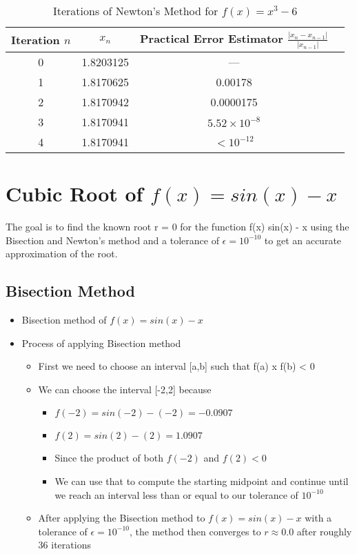 \documentclass[9pt]{extarticle}
\begin{document}
\begin{table}[H]
\centering
\begin{tabular}{|c|c|c|c|}
\hline
Iteration \(n\) & \(x_n\)           & Practical Error Estimator \( \frac{|x_n - x_{n-1}|}{|x_{n-1}|} \) \\ \hline
0               & 1.8203125         & —                                                      \\ \hline
1               & 1.8170625         & 0.00178                                                \\ \hline
2               & 1.8170942         & 0.0000175                                              \\ \hline
3               & 1.8170941         & \( 5.52 \times 10^{-8} \)                              \\ \hline
4               & 1.8170941         & \( < 10^{-12} \)                                       \\ \hline
\end{tabular}
\caption{Iterations of Newton's Method for \( f(x) = x^3 - 6 \)}
\label{tab:newtons_method_iterations}
\end{table}

\newpage
\section{Cubic Root of $f(x) = sin(x) - x$}
The goal is to find the known root r = 0 for the function f(x) sin(x) - x using the Bisection and Newton's method and a tolerance of $\epsilon = 10^{-10}$ to get an accurate approximation of the root.

\subsection{Bisection Method}
\begin{itemize}
    \item Bisection method of $f(x) = sin(x) - x$
    \item Process of applying Bisection method
    \begin{itemize}
        \item First we need to choose an interval [a,b] such that f(a) x f(b) < 0
        \item We can choose the interval [-2,2] because 
        \begin{itemize}
            \item $f(-2) = sin(-2)-(-2) = -0.0907$
            \item $f(2) = sin(2) -(2) = 1.0907$
            \item Since the product of both $f(-2)$ and $f(2) < 0$
            \item We can use that to compute the starting midpoint and continue until we reach an interval less than or equal to our tolerance of $10^{-10}$
        \end{itemize}
        \item After applying the Bisection method to $f(x) = sin(x) - x$ with a tolerance of $\epsilon = 10^{-10}$, the method then converges to $r \approx 0.0$ after roughly 36 iterations
    \end{itemize}
\end{itemize}
\end{document}
